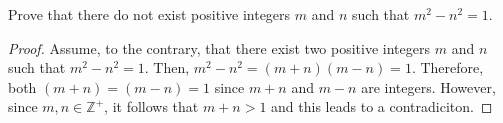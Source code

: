 \documentclass[12pt]{article}
\newcommand{\Z}{\mathbb{Z}}
\newenvironment{problem}[2][Problem]{\begin{trivlist}
		\item[\hskip \labelsep {\bfseries #1}\hskip \labelsep {\bfseries #2.}]}{\end{trivlist}}
\begin{document}
	\begin{problem}{28}
		Prove that there do not exist positive integers $m$ and $n$ such that $m^{2}-n^{2}=1$.
		\begin{proof}
			Assume, to the contrary, that there exist two positive integers $m$ and $n$ such that $m^{2}-n^{2}=1$. Then, $m^{2}-n^{2} = (m+n)(m-n) = 1$.
 		Therefore, both $(m+n) = (m-n) = 1$ since $m+n$ and $m-n$ are integers. However, since $m,n\in \Z^{+}$, it follows that $m+n>1$ and this leads to a contradiciton.
		\end{proof}
	\end{problem}
\end{document}
